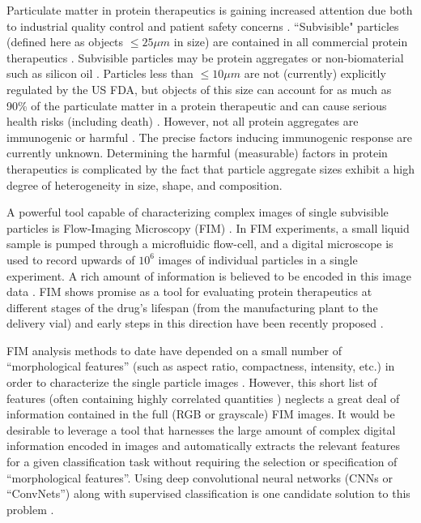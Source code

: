 \documentclass[%
reprint,
superscriptaddress,
 aps,
 pre,
]{revtex4-1}
\begin{document}
Particulate matter in protein therapeutics is gaining increased attention  due both to industrial quality control and patient safety concerns  \cite{Saggu2017,Kotarek2016,Maddux2017}.
``Subvisible" particles (defined here as objects $\le 25 \mu m$ in size) are contained in all commercial protein therapeutics \cite{Saggu2017}. 
Subvisible particles may be protein  aggregates or non-biomaterial such as silicon oil \cite{Zolls2013,Saggu2017}.   
%
Particles less than $\le 10 \mu m$ are not (currently) explicitly regulated by the US FDA, but objects of this size can account for as much as 90\% of the particulate matter in a protein therapeutic \cite{RN20228} and can cause serious health risks (including death) \cite{RN20229,RN20334,RN20195,Kotarek2016}.  However, not all protein aggregates are immunogenic or harmful \cite{RN20232}.  The precise factors inducing immunogenic response are currently unknown.  Determining the harmful 
(measurable)
 factors in protein therapeutics is complicated by the fact that particle aggregate sizes exhibit a high degree of heterogeneity in size, shape, and composition.  




A powerful tool capable of characterizing complex images of single subvisible particles is Flow-Imaging Microscopy (FIM) \cite{Kotarek2016,Zolls2013}. In FIM experiments, a small liquid sample is pumped through a microfluidic flow-cell, and a digital microscope is used to 
record upwards of $10^6$ images of individual particles in a single experiment.   A rich amount of information is believed to be encoded
in this image data \cite{Maddux2017}.   FIM shows promise as a tool for evaluating protein therapeutics at different stages of the drug's lifespan (from the manufacturing plant to the delivery vial) and early steps in this direction have been recently proposed \cite{Maddux2017}.  
 

FIM analysis methods to date have depended on a small number of ``morphological features'' (such as aspect ratio, compactness, intensity, etc.) in order to characterize the single particle images \cite{Saggu2017,RiosQuiroz2016,Maddux2017}.  However, this short list of features (often containing highly correlated quantities \cite{Saggu2017}) neglects a great deal of information contained in the full (RGB or grayscale) FIM images.  It would be desirable to leverage a tool that harnesses the large amount of complex digital information encoded in images and automatically extracts the relevant features for a given classification task 
without requiring the selection or specification of ``morphological features''.  Using deep convolutional neural networks (CNNs or ``ConvNets'') along with supervised  classification is one candidate solution to this problem \cite{LeCun2015}.
\end{document}
